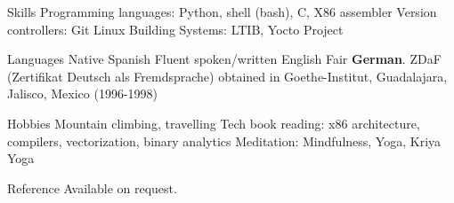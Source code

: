 \documentclass{resume}
\begin{document}
\begin{category}{Skills}
\citembullet Programming languages: Python, shell (bash), C, X86 assembler
\citembullet Version controllers: Git
\citembullet Linux Building Systems: LTIB, Yocto Project
\end{category}

\begin{category}{Languages}
\citembullet Native Spanish
\citembullet Fluent spoken/written English
\citembullet Fair \textbf{German}. ZDaF (Zertifikat Deutsch als Fremdsprache) obtained in Goethe-Institut, Guadalajara, Jalisco, Mexico (1996-1998)
\end{category}

\begin{category}{Hobbies}
\citembullet Mountain climbing, travelling
\citembullet Tech book reading: x86 architecture, compilers, vectorization, binary analytics
\citembullet Meditation: Mindfulness, Yoga, Kriya Yoga
\end{category}

\begin{category}{Reference} 
\citemnobullet Available on request.
\end{category}
\end{document}
